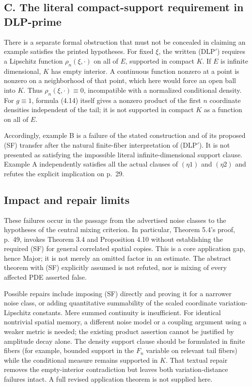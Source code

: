 \documentclass[10pt]{article}
\begin{document}
\subsection*{C. The literal compact-support requirement in DLP-prime}
There is a separate formal obstruction that must not be concealed in claiming an example satisfies the printed hypotheses. For fixed \(\xi\), the written (DLP\('\)) requires a Lipschitz function \(\rho_n(\xi,\cdot)\) on all of \(E\), supported in compact \(K\). If \(E\) is infinite dimensional, \(K\) has empty interior. A continuous function nonzero at a point is nonzero on a neighborhood of that point, which here would force an open ball into \(K\). Thus \(\rho_n(\xi,\cdot)\equiv0\), incompatible with a normalized conditional density. For \(g\equiv1\), formula (4.14) itself gives a nonzero product of the first \(n\) coordinate densities independent of the tail; it is not supported in compact \(K\) as a function on all of \(E\).\par
Accordingly, example B is a failure of the stated construction and of its proposed (SF) transfer after the natural finite-fiber interpretation of (DLP\('\)). It is not presented as satisfying the impossible literal infinite-dimensional support clause. Example A independently satisfies all the actual clauses of \((\eta1)\) and \((\eta2)\) and refutes the explicit implication on p. 29.\par
\subsection*{Impact and repair limits}
These failures occur in the passage from the advertised noise classes to the hypotheses of the central mixing criterion. In particular, Theorem 5.4’s proof, p. 49, invokes Theorem 3.4 and Proposition 4.10 without establishing the required (SF) for general correlated spatial copies. This is a core application gap, hence Major; it is not merely an omitted factor in an estimate. The abstract theorem with (SF) explicitly assumed is not refuted, nor is mixing of every affected PDE asserted false.\par
Possible repairs include imposing (SF) directly and proving it for a narrower noise class, or adding quantitative summability of the scaled coordinate variation-Lipschitz constants. Mere summed continuity is insufficient. For identical nontrivial spatial memory, a different noise model or a coupling argument using a weaker metric is needed; the existing product assertion cannot be justified by amplitude decay alone. The density support clause should be formulated in finite fibers (for example, bounded support in the \(F_n\) variable on relevant tail fibers) while the conditional measure remains supported in \(K\). That textual repair removes the empty-interior contradiction but leaves both variation-distance failures intact. A full revised application theorem is not supplied here.\par
\end{document}
